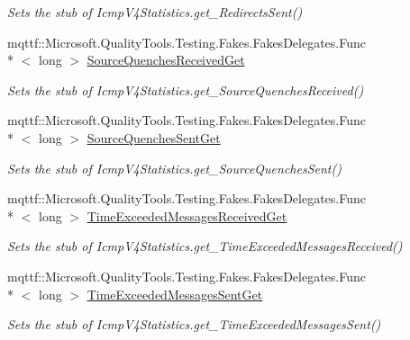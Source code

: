 \begin{DoxyCompactItemize}
\begin{DoxyCompactList}\small\item\em Sets the stub of Icmp\-V4\-Statistics.\-get\-\_\-\-Redirects\-Sent()\end{DoxyCompactList}\item 
mqttf\-::\-Microsoft.\-Quality\-Tools.\-Testing.\-Fakes.\-Fakes\-Delegates.\-Func\\*
$<$ long $>$ \hyperlink{class_system_1_1_net_1_1_network_information_1_1_fakes_1_1_stub_icmp_v4_statistics_a6512dd602667c99e7bd9515120ee40f1}{Source\-Quenches\-Received\-Get}
\begin{DoxyCompactList}\small\item\em Sets the stub of Icmp\-V4\-Statistics.\-get\-\_\-\-Source\-Quenches\-Received()\end{DoxyCompactList}\item 
mqttf\-::\-Microsoft.\-Quality\-Tools.\-Testing.\-Fakes.\-Fakes\-Delegates.\-Func\\*
$<$ long $>$ \hyperlink{class_system_1_1_net_1_1_network_information_1_1_fakes_1_1_stub_icmp_v4_statistics_a951c6558f05cad731f16bf5baeae8d0f}{Source\-Quenches\-Sent\-Get}
\begin{DoxyCompactList}\small\item\em Sets the stub of Icmp\-V4\-Statistics.\-get\-\_\-\-Source\-Quenches\-Sent()\end{DoxyCompactList}\item 
mqttf\-::\-Microsoft.\-Quality\-Tools.\-Testing.\-Fakes.\-Fakes\-Delegates.\-Func\\*
$<$ long $>$ \hyperlink{class_system_1_1_net_1_1_network_information_1_1_fakes_1_1_stub_icmp_v4_statistics_a0732d7e123ec2e478f23dbc8c4dd65a2}{Time\-Exceeded\-Messages\-Received\-Get}
\begin{DoxyCompactList}\small\item\em Sets the stub of Icmp\-V4\-Statistics.\-get\-\_\-\-Time\-Exceeded\-Messages\-Received()\end{DoxyCompactList}\item 
mqttf\-::\-Microsoft.\-Quality\-Tools.\-Testing.\-Fakes.\-Fakes\-Delegates.\-Func\\*
$<$ long $>$ \hyperlink{class_system_1_1_net_1_1_network_information_1_1_fakes_1_1_stub_icmp_v4_statistics_a84e4ced198b7d33838ece23dc51a16ee}{Time\-Exceeded\-Messages\-Sent\-Get}
\begin{DoxyCompactList}\small\item\em Sets the stub of Icmp\-V4\-Statistics.\-get\-\_\-\-Time\-Exceeded\-Messages\-Sent()\end{DoxyCompactList}\item 

\end{DoxyCompactItemize}
